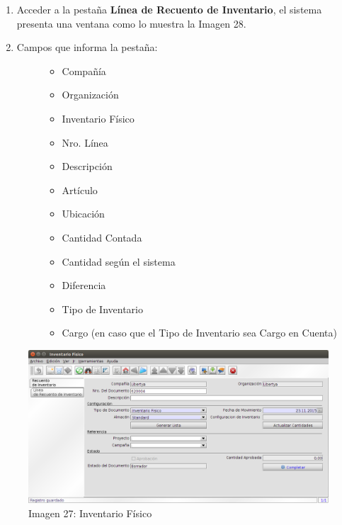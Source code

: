 \documentclass[letterpaper,10pt,spanish]{sphinxmanual}
\begin{document}
\begin{enumerate}
\begin{description}
\begin{itemize}
\end{itemize}

\end{description}

\item {} 
Acceder a la pestaña \textbf{Línea de Recuento de Inventario}, el sistema presenta una ventana como lo muestra la Imagen 28.

\item {} \begin{description}
\item[{Campos que informa la pestaña:}] \leavevmode\begin{itemize}
\item {} 
Compañía

\item {} 
Organización

\item {} 
Inventario Físico

\item {} 
Nro. Línea

\item {} 
Descripción

\item {} 
Artículo

\item {} 
Ubicación

\item {} 
Cantidad Contada

\item {} 
Cantidad según el sistema

\item {} 
Diferencia

\item {} 
Tipo de Inventario

\item {} 
Cargo (en caso que el Tipo de Inventario sea Cargo en Cuenta)

\end{itemize}

\end{description}

\end{enumerate}
\begin{figure}[htbp]
\centering
\capstart

\includegraphics{ly_invfisico_1.png}
\caption{Imagen 27: Inventario Físico}\end{figure}
\end{document}
